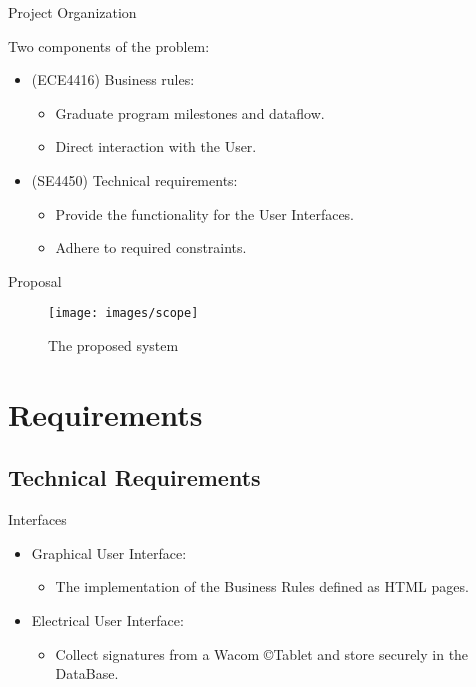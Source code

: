 \documentclass{beamer}
\begin{document}
\begin{frame}{Project Organization}

Two components of the problem:
\begin{itemize}
\item
(ECE4416) Business rules:
\begin{itemize}
\item
Graduate program milestones and dataflow.
\item
Direct interaction with the User.
\end{itemize}
\item 
(SE4450) Technical requirements:
\begin{itemize}
\item
Provide the functionality for the User Interfaces.
\item 
Adhere to required constraints.
\end{itemize}
\end{itemize}



\end{frame}
\begin{frame}{Proposal}

\begin{figure}
\texttt{[image: images/scope]} \caption{ The proposed system }
\end{figure}

\end{frame}
\section{Requirements}

\subsection{Technical Requirements}

\begin{frame}{Interfaces}
\begin{itemize}
\item 
Graphical User Interface:
\begin{itemize}
\item 
The implementation of the Business Rules defined as HTML pages. 
\end{itemize}
\item 
Electrical User Interface:
	\begin{itemize}
	\item 
	Collect signatures from a Wacom \copyright Tablet and store securely in the DataBase.
	\end{itemize}
\end{itemize}
\end{frame}
\end{document}
